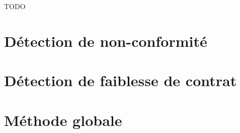 

TODO

\section{Détection de non-conformité}
\section{Détection de faiblesse de contrat}
\section{Méthode globale}
